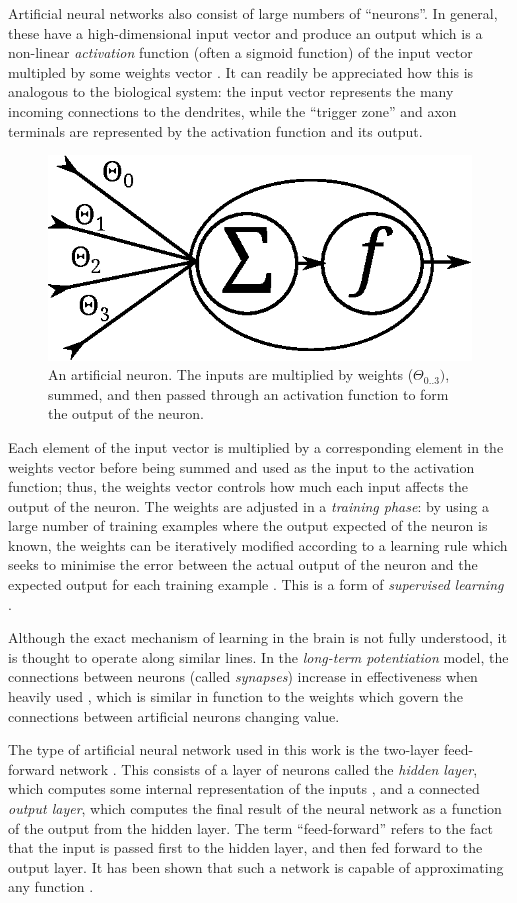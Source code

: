Artificial neural networks also consist of large numbers of ``neurons''.  In general, these have a high-dimensional input vector and produce an output which is a non-linear \emph{activation} function (often a sigmoid function) of the input vector multipled by some weights vector \cite[p. 1]{Annema1995}.  It can readily be appreciated how this is analogous to the biological system: the input vector represents the many incoming connections to the dendrites, while the ``trigger zone'' and axon terminals are represented by the activation function and its output.

\begin{figure}[ht]
\centering
\includegraphics[width=0.5\linewidth]{diagrams/neuron}
\caption[An artificial neuron]{An artificial neuron.  The inputs are multiplied by weights ($\Theta_{0..3})$, summed, and then passed through an activation function to form the output of the neuron.}
\label{fig:neuron}
\end{figure}

Each element of the input vector is multiplied by a corresponding element in the weights vector before being summed and used as the input to the activation function; thus, the weights vector controls how much each input affects the output of the neuron.  The weights are adjusted in a \emph{training phase}: by using a large number of training examples where the output expected of the neuron is known, the weights can be iteratively modified according to a learning rule which seeks to minimise the error between the actual output of the neuron and the expected output for each training example \cite[p. 1]{Annema1995}.  This is a form of \emph{supervised learning} \cite[p. 695]{RussellNorvig}.

Although the exact mechanism of learning in the brain is not fully understood, it is thought to operate along similar lines.  In the \emph{long-term potentiation} model, the connections between neurons (called \emph{synapses}) increase in effectiveness when heavily used \cite[p. 271]{Vander}, which is similar in function to the weights which govern the connections between artificial neurons changing value.

The type of artificial neural network used in this work is the two-layer feed-forward network \cite[p. 4]{Aleksander1995}.  This consists of a layer of neurons called the \emph{hidden layer}, which computes some internal representation of the inputs \cite[p. 135]{Aleksander1995}, and a connected \emph{output layer}, which computes the final result of the neural network as a function of the output from the hidden layer.  The term ``feed-forward'' refers to the fact that the input is passed first to the hidden layer, and then fed forward to the output layer.  It has been shown that such a network is capable of approximating any function \cite[p. 10]{Annema1995}.

